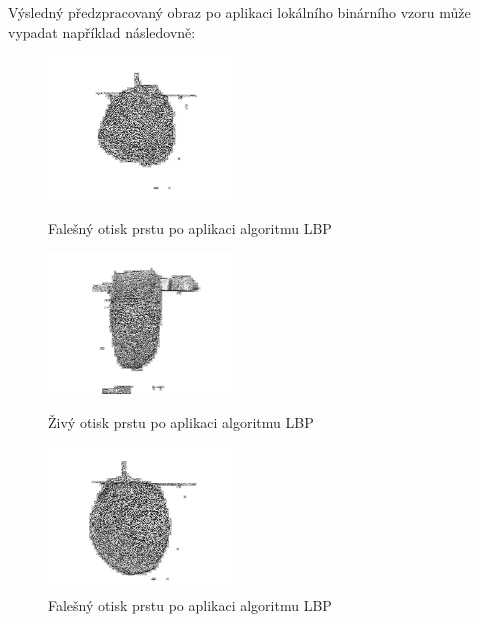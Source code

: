 Výsledný předzpracovaný obraz po aplikaci lokálního binárního vzoru může vypadat například následovně:
\begin{figure}[!htbp]
  \begin{minipage}[b]{0.3\linewidth}
    \centering
    \includegraphics[width=190px]{obrazky-figures/fake53otsulbp.png}
    \caption{Falešný otisk prstu po aplikaci algoritmu LBP}
  \end{minipage}
  \hspace{0.3cm}
  \begin{minipage}[b]{0.3\linewidth}
    \centering
    \includegraphics[width=190px]{obrazky-figures/Images29lbp.png}
    \caption{Živý otisk prstu po aplikaci algoritmu LBP}
  \end{minipage}
  \hspace{0.3cm}
    \begin{minipage}[b]{0.3\linewidth}
    \centering
    \includegraphics[width=190px]{obrazky-figures/fake44otsulbp.png}
    \caption{Falešný otisk prstu po aplikaci algoritmu LBP}
  \end{minipage}
\end{figure}

 
